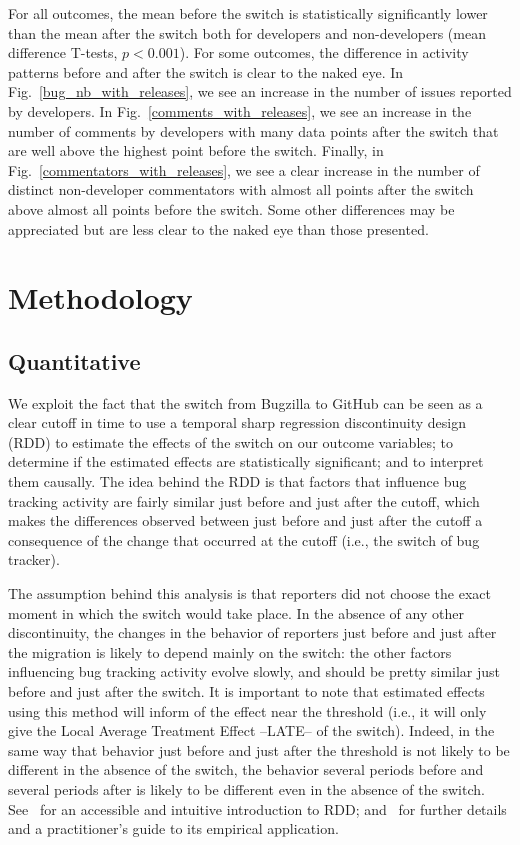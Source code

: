 \documentclass[conference]{IEEEtran}
\begin{document}
For all outcomes, the mean before the switch is statistically significantly lower than the mean after the switch both for developers and non-developers (mean difference T-tests, $p < 0.001$). For some outcomes, the difference in activity patterns before and after the switch is clear to the naked eye. In Fig.~\ref{bug_nb_with_releases}, we see an increase in the number of issues reported by developers. In Fig.~\ref{comments_with_releases}, we see an increase in the number of comments by developers with many data points after the switch that are well above the highest point before the switch. Finally, in Fig.~\ref{commentators_with_releases}, we see a clear increase in the number of distinct non-developer commentators with almost all points after the switch above almost all points before the switch. Some other differences may be appreciated but are less clear to the naked eye than those presented.

\section{Methodology}
\label{methodology}

\subsection{Quantitative}
We exploit the fact that the switch from Bugzilla to GitHub can be seen as a clear cutoff in time to use a temporal sharp regression discontinuity design (RDD) to estimate the effects of the switch on our outcome variables; to determine if the estimated effects are statistically significant; and to interpret them causally.
The idea behind the RDD is that factors that influence bug tracking activity are fairly similar just before and just after the cutoff, which makes the differences observed between just before and just after the cutoff a consequence of the change that occurred at the cutoff (i.e., the switch of bug tracker).

The assumption behind this analysis is that reporters did not choose the exact moment in which the switch would take place. In the absence of any other discontinuity, the changes in the behavior of reporters just before and just after the migration is likely to depend mainly on the switch: the other factors influencing bug tracking activity evolve slowly, and should be pretty similar just before and just after the switch. It is important to note that estimated effects using this method will inform of the effect near the threshold (i.e., it will only give the Local Average Treatment Effect --LATE-- of the switch). Indeed, in the same way that behavior just before and just after the threshold is not likely to be different in the absence of the switch, the behavior several periods before and several periods after is likely to be different even in the absence of the switch. See~\cite{angrist2014mastering,angrist2008mostly} for an accessible and intuitive introduction to RDD; and~\cite{lee2010regression,jacob2012practical} for further details and a practitioner's guide to its empirical application.
\end{document}
